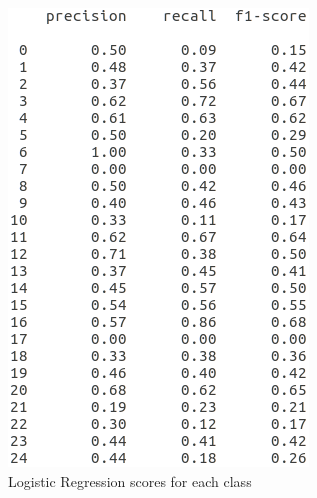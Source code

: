\documentclass{article} %
\begin{document}
\begin{figure}[H]
	\includegraphics[width=\linewidth]{lr_scores.png}
	\caption{Logistic Regression scores for each class}\label{fig:lr_scores.png}
	\endminipage\hfill\hfill\hfill\hfill\hfill\hfill

\end{figure}
\end{document}
